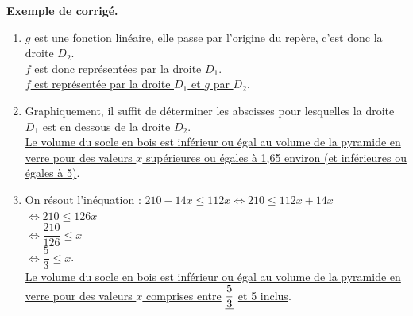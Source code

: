 \begin{activite}
   \textcolor{G1}{
   {\bf Exemple de corrigé.} \smallskip
      \begin{enumerate}
         \item $g$ est une fonction linéaire, elle passe par l'origine du repère, c'est donc la droite $D_2$. \\
            $f$ est donc représentées par la droite $D_1$. \\
            \uline{$f$ est représentée par la droite $D_1$ et $g$ par $D_2$}.
         \item Graphiquement, il suffit de déterminer les abscisses pour lesquelles la droite $D_1$ est en dessous de la droite $D_2$. \\
            \uline{Le volume du socle en bois est inférieur ou égal au volume de la pyramide en verre pour des valeurs $x$ supérieures ou égales à 1,65 environ (et inférieures ou égales à 5)}.
         \item On résout l'inéquation : $210-14x \leq 112x \iff 210 \leq 112x+14x$ \\
            \hspace*{6.1cm} $\iff 210 \leq 126x$ \\ [1mm]
            \hspace*{6.1cm} $\iff \dfrac{210}{126} \leq x$ \\ [1mm]
            \hspace*{6.1cm} $\iff \dfrac53 \leq x$. \\ [1mm]
            \uline{Le volume du socle en bois est inférieur ou égal au volume de la pyramide en verre pour des valeurs $x$ comprises entre} $\uline{\dfrac53}$ \uline{et 5 inclus}.
      \end{enumerate}}
\end{activite}

\pagebreak


